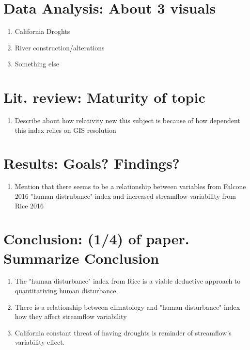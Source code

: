 \documentclass{article}
\begin{document}
\section{Data Analysis: About 3 visuals}

    \begin{enumerate}
        \item California Droghts
        \item River construction/alterations
        \item Something else
    \end{enumerate}

\section{Lit. review: Maturity of topic}

    \begin{enumerate}
        \item Describe about how relativity new this subject is because of how dependent this index relies on GIS resolution
    \end{enumerate}

\section{Results: Goals? Findings?}

    \begin{enumerate}
        \item Mention that there seems to be a relationship between variables from Falcone 2016 "human distrubance" index and increased streamflow variability from Rice 2016
    \end{enumerate}

\section{Conclusion: (1/4) of paper. Summarize Conclusion}


    \begin{enumerate}
        \item The "human disturbance" index from Rice is a viable deductive approach to quantitativing human disturbance. 
        \item There is a relationship  between climatology and "human disturbance" index how they affect streamflow variability 
        \item California constant threat of having droughts is reminder of streamflow's variability effect.
    \end{enumerate}
\end{document}

